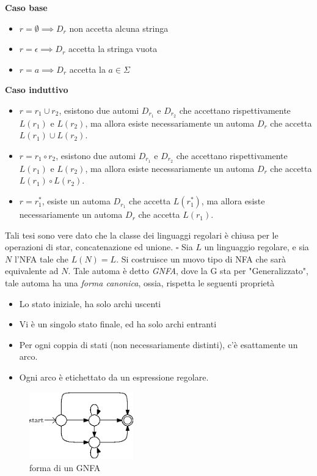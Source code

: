 \documentclass[10pt, letterpaper]{report}
\begin{document}
\textbf{Caso base }\begin{itemize}
    \item $r=\emptyset\implies D_r$ non accetta alcuna stringa 
    \item $r=\epsilon\implies D_r$  accetta la stringa vuota
    \item $r=a\implies D_r$  accetta la $a\in\Sigma$
\end{itemize}
\textbf{Caso induttivo}\begin{itemize}
    \item $r=r_1\cup r_2$, esistono due automi $D_{r_1}$ e  $D_{r_2}$ che accettano rispettivamente $L(r_1)$ 
    e $L(r_2)$, ma allora esiste necessariamente un automa $D_r$ che accetta $L(r_1)\cup L(r_2)$.
    \item $r=r_1\circ r_2$,  esistono due automi $D_{r_1}$ e  $D_{r_2}$ che accettano rispettivamente $L(r_1)$ 
    e $L(r_2)$, ma allora esiste necessariamente un automa $D_r$ che accetta $L(r_1)\circ L(r_2)$.
    \item $r=r_1^*$, esiste un automa $D_{r_1}$  che accetta
     $L(r_1^*)$, ma allora esiste necessariamente un automa $D_r$ che accetta $L(r_1)$.
\end{itemize}
Tali tesi sono vere dato che la classe dei linguaggi regolari è chiusa per le operazioni di star, concatenazione 
ed unione. $\square $\acc 
{} Sia $L$ un linguaggio regolare, e sia $N$ l'NFA tale che 
$L(N)=L$. Si costruisce un nuovo tipo di NFA che sarà equivalente ad $N$. Tale automa è detto \textit{GNFA}, 
dove la G sta per "Generalizzato", tale automa ha una \textit{forma canonica}, ossia, rispetta le seguenti 
proprietà \begin{itemize}
    \item Lo stato iniziale, ha solo archi uscenti 
    \item Vi è un singolo stato finale, ed ha solo archi entranti
    \item Per ogni coppia di stati (non necessariamente distinti), c'è esattamente un arco.
    \item Ogni arco è etichettato da un espressione regolare.
\end{itemize}
\begin{center}
    \begin{figure}[h!]
        \centering 
        \includegraphics[width=0.4\textwidth ]{images/GNFA.eps}
        \caption{forma di un GNFA}
        \label{fig:GNFA}
    \end{figure}
\end{center}
\end{document}
